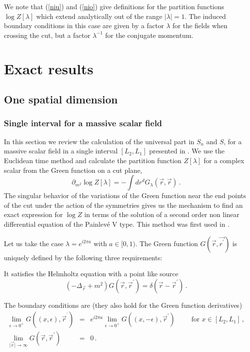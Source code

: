 \documentclass[11pt]{article}
\begin{document}
We note  that (\ref{niu}) and (\ref{nio}) give definitions for the partition functions $\log Z[\lambda]$ which extend analytically out of the range $|\lambda|=1$. The induced boundary conditions in this case are given by a factor $\lambda$ for the fields when crossing the cut, but a factor $\lambda^{-1}$ for the conjugate momentum.   

\section{Exact results}



\subsection{One spatial dimension}

\subsubsection{Single interval for a massive scalar field}
In this section we review the calculation of the universal part in $S_n$ and $S$, for a massive scalar field in a single interval $[L_2,L_1]$ presented in \cite{boson}. We use the Euclidean time method and
calculate the partition function $Z[\lambda]$ for a complex scalar from the Green function on a cut plane,
\begin{equation}
 \partial_{m^2}\log Z[\lambda]= -\int dr^d G_\lambda(\vec{r},\vec{r})\,.\label{gdgd}
\end{equation} 
 The singular behavior of the variations of the Green function near the end points of the cut under the action of the symmetries gives us the mechanism to find an exact expression for $\log Z$ in terms of the solution of
a second order non linear differential equation of the Painlev\'e V type. This method was first used in \cite{Myers}. 

Let us take the case $\lambda=e^{i 2 \pi a}$ with $a\in[0,1)$. The Green function $G(\vec{r},\vec{r^\prime})$ is uniquely defined by the following three requirements:

 It satisfies the Helmholtz equation with a point like source
\begin{equation}
\left( -\Delta _{\vec{r}}+m^{2}\right) G(\vec{r},\vec{r}^{\prime})=\delta (
\vec{r}-\vec{r}^{\prime})\,. \label{g1}
\end{equation}

 The boundary conditions are (they also hold for the Green function derivatives)
\begin{eqnarray}
\lim_{\epsilon \rightarrow 0^{+}}G((x,\epsilon ),\vec{r}^{^{\prime
}})&=&e^{i2\pi a }\lim_{\epsilon \rightarrow 0^{+}}G((x,-\epsilon ),\vec{r
}^{\prime}) \hspace{1cm} \textrm{for}\,\, x \in [L_{2},L_{1}]\,, \label{bcc1}\\
\lim_{\vert \vec{r} \vert \rightarrow \infty}G(\vec{r},\vec{r}^{\prime
})&=&0 \,.
\end{eqnarray}
\end{document}
